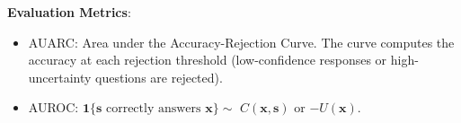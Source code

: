 
\begin{block}{\color{mydarkgreen}{Experiment Results}}




\textbf{Evaluation Metrics}: 
\begin{itemize}
    \item AUARC: Area under the Accuracy-Rejection Curve. 
    The curve computes the accuracy at each rejection threshold (low-confidence responses or high-uncertainty questions are rejected).
    \item AUROC: $\mathbf{1}\{{\mathbf{s}\text{ correctly answers } \mathbf{x}}\}\sim$ $C(\mathbf{x}, \mathbf{s})$ or $-U(\mathbf{x})$.
\end{itemize}



\end{block}
